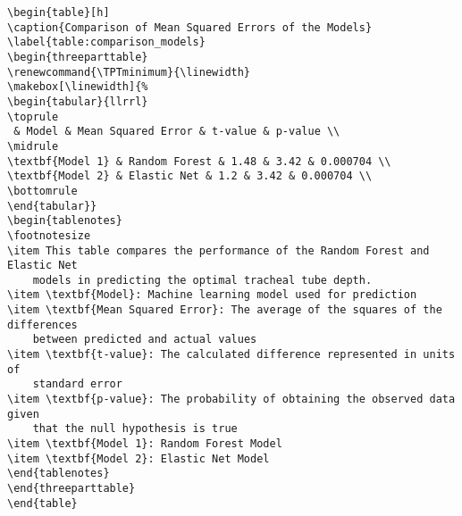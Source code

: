 \documentclass[11pt]{article}
\begin{document}
\begin{Verbatim}[tabsize=4]
\begin{table}[h]
\caption{Comparison of Mean Squared Errors of the Models}
\label{table:comparison_models}
\begin{threeparttable}
\renewcommand{\TPTminimum}{\linewidth}
\makebox[\linewidth]{%
\begin{tabular}{llrrl}
\toprule
 & Model & Mean Squared Error & t-value & p-value \\
\midrule
\textbf{Model 1} & Random Forest & 1.48 & 3.42 & 0.000704 \\
\textbf{Model 2} & Elastic Net & 1.2 & 3.42 & 0.000704 \\
\bottomrule
\end{tabular}}
\begin{tablenotes}
\footnotesize
\item This table compares the performance of the Random Forest and Elastic Net
	models in predicting the optimal tracheal tube depth.
\item \textbf{Model}: Machine learning model used for prediction
\item \textbf{Mean Squared Error}: The average of the squares of the differences
	between predicted and actual values
\item \textbf{t-value}: The calculated difference represented in units of
	standard error
\item \textbf{p-value}: The probability of obtaining the observed data given
	that the null hypothesis is true
\item \textbf{Model 1}: Random Forest Model
\item \textbf{Model 2}: Elastic Net Model
\end{tablenotes}
\end{threeparttable}
\end{table}

\end{Verbatim}
\end{document}
